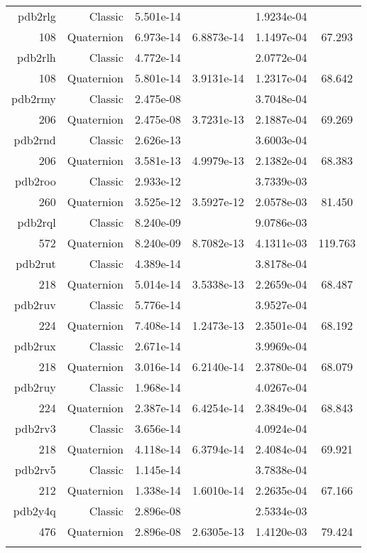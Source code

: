 \begin{xltabular}{\textwidth}{r|rS[table-format=1.3e+2]S[table-format=1.4e+2]S[table-format=1.4e+2]S[table-format=-1.3]}
pdb2rlg & Classic & 5.501e-14 &  & 1.9234e-04 & \\
108 & Quaternion & 6.973e-14 & 6.8873e-14 & 1.1497e-04 & 67.293\\  \addlinespace
pdb2rlh & Classic & 4.772e-14 &  & 2.0772e-04 & \\
108 & Quaternion & 5.801e-14 & 3.9131e-14 & 1.2317e-04 & 68.642\\  \addlinespace
pdb2rmy & Classic & 2.475e-08 &  & 3.7048e-04 & \\
206 & Quaternion & 2.475e-08 & 3.7231e-13 & 2.1887e-04 & 69.269\\  \addlinespace
pdb2rnd & Classic & 2.626e-13 &  & 3.6003e-04 & \\
206 & Quaternion & 3.581e-13 & 4.9979e-13 & 2.1382e-04 & 68.383\\  \addlinespace
pdb2roo & Classic & 2.933e-12 &  & 3.7339e-03 & \\
260 & Quaternion & 3.525e-12 & 3.5927e-12 & 2.0578e-03 & 81.450\\  \addlinespace
pdb2rql & Classic & 8.240e-09 &  & 9.0786e-03 & \\
572 & Quaternion & 8.240e-09 & 8.7082e-13 & 4.1311e-03 & 119.763\\  \addlinespace
pdb2rut & Classic & 4.389e-14 &  & 3.8178e-04 & \\
218 & Quaternion & 5.014e-14 & 3.5338e-13 & 2.2659e-04 & 68.487\\  \addlinespace
pdb2ruv & Classic & 5.776e-14 &  & 3.9527e-04 & \\
224 & Quaternion & 7.408e-14 & 1.2473e-13 & 2.3501e-04 & 68.192\\  \addlinespace
pdb2rux & Classic & 2.671e-14 &  & 3.9969e-04 & \\
218 & Quaternion & 3.016e-14 & 6.2140e-14 & 2.3780e-04 & 68.079\\  \addlinespace
pdb2ruy & Classic & 1.968e-14 &  & 4.0267e-04 & \\
224 & Quaternion & 2.387e-14 & 6.4254e-14 & 2.3849e-04 & 68.843\\  \addlinespace
pdb2rv3 & Classic & 3.656e-14 &  & 4.0924e-04 & \\
218 & Quaternion & 4.118e-14 & 6.3794e-14 & 2.4084e-04 & 69.921\\  \addlinespace
pdb2rv5 & Classic & 1.145e-14 &  & 3.7838e-04 & \\
212 & Quaternion & 1.338e-14 & 1.6010e-14 & 2.2635e-04 & 67.166\\  \addlinespace
pdb2y4q & Classic & 2.896e-08 &  & 2.5334e-03 & \\
476 & Quaternion & 2.896e-08 & 2.6305e-13 & 1.4120e-03 & 79.424\\  \addlinespace
\end{xltabular}
